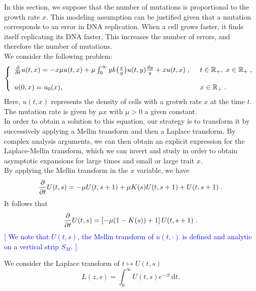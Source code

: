 \documentclass[11pt]{amsart}
\newcommand{\diff}{\,\mathrm{d}}
\newcommand{\ndr}[1]{\textcolor{blue}{[#1]}}
\begin{document}
In this section, we suppose that the number of mutations is proportional to the growth rate $x$. This modeling assumption can be justified given that a mutation corresponds to an error in DNA replication. When a cell grows faster, it finds itself replicating its DNA faster. This increases the number of errors, and therefore the number of mutations.\\

We consider the following problem:
\begin{equation}\left\{
    \begin{array}{ll}
	\frac{\partial}{\partial t}u(t,x) = - x\mu u(t,x) + \mu \int_{0}^{\infty} y k\big( \frac{x}{y}\big) u(t,y) \frac{\mathrm dy}{y} + xu(t,x)
	\; , \enspace
	& t \in \mathbb{R}_+, \; x \in \mathbb{R}_+ \; ,
	\\ \\
	u(0, x) = u_0(x),
	& x \in \mathbb{R}_+
	\; .
    \end{array}
	\right.
    \label{eq:linearmutrate}
\end{equation}
Here, $u(t,x)$ represents the density of cells with a grotwh rate $x$ at the time $t$. The mutation rate is given by $\mu x$ with $\mu>0$ a given constant. \\

In order to obtain a solution to this equation, our strategy is to transform it by successively applying a Mellin transform and then a Laplace transform. By complex analysis arguments, we can then obtain an explicit expression for the Laplace-Mellin transform, which we can invert and study in order to obtain asymptotic expansions for large times and small or large trait $x$. \\

By applying the Mellin transform in the $x$ variable, we have
	\begin{equation*}
		\frac{\partial}{\partial t} U(t,s) = - \mu U(t,s+1) + \mu K(s) U(t,s+1) + U(t,s+1)
		\; .
	\end{equation*}
It follows that
    \begin{equation}
        \frac{\partial}{\partial t} U(t,s) = \left[- \mu (1-K(s)) + 1\right] U(t,s+1)
		\; .
        \label{eq:addgrowtheasy}
    \end{equation}
    \ndr{
We note that $U(t,s)$, the Mellin transform of $u(t,\cdot)$ is defined and analytic on a vertical strip $S_M$. }

We consider the Laplace transform of $t \mapsto U(t,s)$
$$ L(z,s) = \int_0^\infty U(t,s)e^{-zt}\diff t.$$ 
\end{document}
